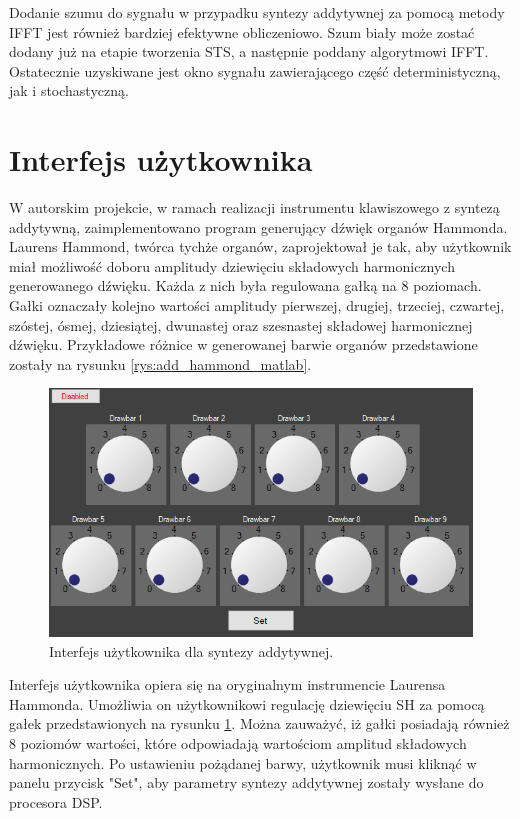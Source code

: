 Dodanie szumu do sygnału w przypadku syntezy addytywnej za pomocą metody IFFT jest również bardziej efektywne obliczeniowo. Szum biały może zostać dodany już na etapie tworzenia STS, a następnie poddany algorytmowi IFFT. Ostatecznie uzyskiwane jest okno sygnału zawierającego część deterministyczną, jak i stochastyczną.

\section{Interfejs użytkownika}
W autorskim projekcie, w ramach realizacji instrumentu klawiszowego z syntezą addytywną, zaimplementowano program generujący dźwięk organów Hammonda. 
Laurens Hammond, twórca tychże organów, zaprojektował je tak, aby użytkownik miał możliwość doboru amplitudy dziewięciu składowych harmonicznych generowanego dźwięku. Każda z nich była regulowana gałką na 8 poziomach. Gałki oznaczały kolejno wartości amplitudy pierwszej, drugiej, trzeciej, czwartej, szóstej, ósmej, dziesiątej, dwunastej oraz szesnastej składowej harmonicznej dźwięku. Przykładowe różnice w generowanej barwie organów przedstawione zostały na rysunku \ref{rys:add_hammond_matlab}.

\begin{figure}[H]
	\centering
	\includegraphics[width=15cm]{grafiki/add_interface}
	\captionsetup{justification=centering}
	\caption{Interfejs użytkownika dla syntezy addytywnej.}
	\label{rys:add_interface}
\end{figure}

Interfejs użytkownika opiera się na oryginalnym instrumencie Laurensa Hammonda. Umożliwia on użytkownikowi regulację dziewięciu SH za pomocą gałek przedstawionych na rysunku \ref{rys:add_interface}. Można zauważyć, iż gałki posiadają również 8 poziomów wartości, które odpowiadają wartościom amplitud składowych harmonicznych. Po ustawieniu pożądanej barwy, użytkownik musi kliknąć w panelu przycisk "Set", aby parametry syntezy addytywnej zostały wysłane do procesora DSP.

